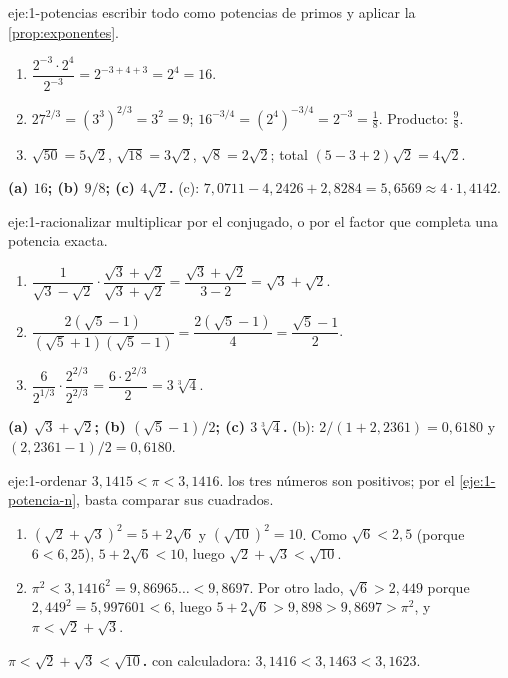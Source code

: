 \begin{solucion}{eje:1-potencias}
\planteamiento escribir todo como potencias de primos y aplicar la \cref{prop:exponentes}.
\pasos
\begin{enumerate}[label=(\alph*)]
  \item $\dfrac{2^{-3}\cdot2^{4}}{2^{-3}}=2^{-3+4+3}=2^4=16$.
  \item $27^{2/3}=(3^3)^{2/3}=3^2=9$; $16^{-3/4}=(2^4)^{-3/4}=2^{-3}=\frac18$. Producto: $\frac98$.
  \item $\sqrt{50}=5\sqrt2$, $\sqrt{18}=3\sqrt2$, $\sqrt8=2\sqrt2$; total $(5-3+2)\sqrt2=4\sqrt2$.
\end{enumerate}
\resultado \textbf{(a) $16$; (b) $9/8$; (c) $4\sqrt2$.}
\comprobacion (c): $7{,}0711-4{,}2426+2{,}8284=5{,}6569\approx4\cdot1{,}4142$.
\end{solucion}

\begin{solucion}{eje:1-racionalizar}
\planteamiento multiplicar por el conjugado, o por el factor que completa una potencia exacta.
\pasos
\begin{enumerate}[label=(\alph*)]
  \item $\dfrac{1}{\sqrt3-\sqrt2}\cdot\dfrac{\sqrt3+\sqrt2}{\sqrt3+\sqrt2}=\dfrac{\sqrt3+\sqrt2}{3-2}=\sqrt3+\sqrt2$.
  \item $\dfrac{2(\sqrt5-1)}{(\sqrt5+1)(\sqrt5-1)}=\dfrac{2(\sqrt5-1)}{4}=\dfrac{\sqrt5-1}2$.
  \item $\dfrac{6}{2^{1/3}}\cdot\dfrac{2^{2/3}}{2^{2/3}}=\dfrac{6\cdot2^{2/3}}{2}=3\sqrt[3]4$.
\end{enumerate}
\resultado \textbf{(a) $\sqrt3+\sqrt2$; (b) $(\sqrt5-1)/2$; (c) $3\sqrt[3]4$.}
\comprobacion (b): $2/(1+2{,}2361)=0{,}6180$ y $(2{,}2361-1)/2=0{,}6180$.
\end{solucion}

\begin{solucion}{eje:1-ordenar}
\datos $3{,}1415<\pi<3{,}1416$.
\planteamiento los tres números son positivos; por el \cref{eje:1-potencia-n}, basta comparar sus cuadrados.
\pasos
\begin{enumerate}[label=\arabic*.]
  \item $(\sqrt2+\sqrt3)^2=5+2\sqrt6$ y $(\sqrt{10})^2=10$. Como $\sqrt6<2{,}5$ (porque $6<6{,}25$), $5+2\sqrt6<10$, luego $\sqrt2+\sqrt3<\sqrt{10}$.
  \item $\pi^2<3{,}1416^2=9{,}86965\ldots<9{,}8697$. Por otro lado, $\sqrt6>2{,}449$ porque $2{,}449^2=5{,}997601<6$, luego $5+2\sqrt6>9{,}898>9{,}8697>\pi^2$, y $\pi<\sqrt2+\sqrt3$.
\end{enumerate}
\resultado \textbf{$\pi<\sqrt2+\sqrt3<\sqrt{10}$.}
\comprobacion con calculadora: $3{,}1416<3{,}1463<3{,}1623$.
\end{solucion}

